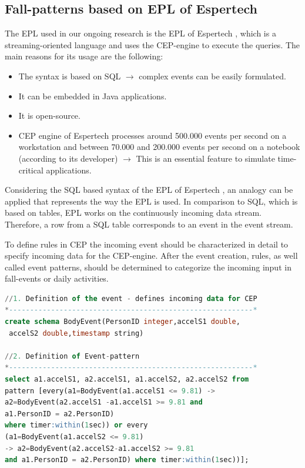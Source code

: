 \documentclass[review]{elsarticle}
\begin{document}
\subsection{Fall-patterns based on EPL of Espertech}
\label{subsec:CEP}
The EPL used in our ongoing research is the EPL of Espertech \cite{Esper:2016}, which is a streaming-oriented language and uses the CEP-engine to execute the queries. The main reasons for its usage are the following:
\begin{itemize}
	\item The syntax is based on SQL $\rightarrow$ complex events can be easily formulated.
	\item It can be embedded in Java applications.
	\item It is open-source.
	\item CEP engine of Espertech processes around 500.000 events per second on a workstation and between 70.000 and 200.000 events per second on a notebook (according to its developer) $\rightarrow$ This is an essential feature to simulate time-critical applications. 
\end{itemize}
Considering the SQL based syntax of the EPL of Espertech \cite{Esper:2016}, an analogy can be applied that represents the way the EPL is used. In comparison to SQL, which is based on tables, EPL works on the continuously incoming data stream. Therefore, a row from a SQL table corresponds to an event in the event stream. 

To define rules in CEP the incoming event should be characterized in detail to specify incoming data for the CEP-engine. After the event creation, rules, as well called event patterns, should be determined to categorize the incoming input in fall-events or daily activities.
 \renewcommand{\lstlistingname}{Example}
\begin{lstlisting}[basicstyle=\ttfamily\footnotesize,language=SQL,caption=Fall pattern based on Kozina et al. \cite{Kozina},label=CEPPattern]
//1. Definition of the event - defines incoming data for CEP
*----------------------------------------------------------*
create schema BodyEvent(PersonID integer,accelS1 double,
 accelS2 double,timestamp string)

//2. Definition of Event-pattern
*----------------------------------------------------------*
select a1.accelS1, a2.accelS1, a1.accelS2, a2.accelS2 from 
pattern [every(a1=BodyEvent(a1.accelS1 <= 9.81) -> 
a2=BodyEvent(a2.accelS1 -a1.accelS1 >= 9.81 and 
a1.PersonID = a2.PersonID) 
where timer:within(1sec)) or every 
(a1=BodyEvent(a1.accelS2 <= 9.81)
-> a2=BodyEvent(a2.accelS2-a1.accelS2 >= 9.81
and a1.PersonID = a2.PersonID) where timer:within(1sec))];
\end{lstlisting}
\end{document}
